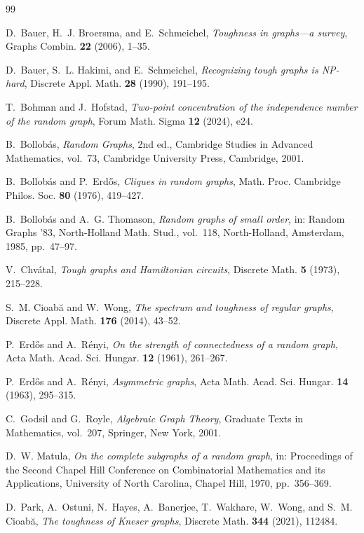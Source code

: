 \documentclass[11pt,reqno]{amsart}
\theoremstyle{definition}
\theoremstyle{remark}
\begin{document}
\begin{thebibliography}{99}

D.~Bauer, H.~J. Broersma, and E.~Schmeichel,
\emph{Toughness in graphs---a survey},
Graphs Combin. \textbf{22} (2006), 1--35.

D.~Bauer, S.~L. Hakimi, and E.~Schmeichel,
\emph{Recognizing tough graphs is NP-hard},
Discrete Appl. Math. \textbf{28} (1990), 191--195.

T.~Bohman and J.~Hofstad,
\emph{Two-point concentration of the independence number of the random graph},
Forum Math. Sigma \textbf{12} (2024), e24.

B.~Bollob\'as,
\emph{Random Graphs}, 2nd ed.,
Cambridge Studies in Advanced Mathematics, vol.~73,
Cambridge University Press, Cambridge, 2001.

B.~Bollob\'as and P.~Erd\H{o}s,
\emph{Cliques in random graphs},
Math. Proc. Cambridge Philos. Soc. \textbf{80} (1976), 419--427.

B.~Bollob\'as and A.~G. Thomason,
\emph{Random graphs of small order},
in: Random Graphs '83, North-Holland Math. Stud., vol.~118,
North-Holland, Amsterdam, 1985, pp.~47--97.

V.~Chv\'atal,
\emph{Tough graphs and Hamiltonian circuits},
Discrete Math. \textbf{5} (1973), 215--228.

S.~M. Cioab\u{a} and W.~Wong,
\emph{The spectrum and toughness of regular graphs},
Discrete Appl. Math. \textbf{176} (2014), 43--52.

P.~Erd\H{o}s and A.~R\'enyi,
\emph{On the strength of connectedness of a random graph},
Acta Math. Acad. Sci. Hungar. \textbf{12} (1961), 261--267.

P.~Erd\H{o}s and A.~R\'enyi,
\emph{Asymmetric graphs},
Acta Math. Acad. Sci. Hungar. \textbf{14} (1963), 295--315.

C.~Godsil and G.~Royle,
\emph{Algebraic Graph Theory},
Graduate Texts in Mathematics, vol.~207,
Springer, New York, 2001.



D.~W. Matula,
\emph{On the complete subgraphs of a random graph},
in: Proceedings of the Second Chapel Hill Conference on Combinatorial Mathematics and its Applications,
University of North Carolina, Chapel Hill, 1970, pp.~356--369.

D.~Park, A.~Ostuni, N.~Hayes, A.~Banerjee, T.~Wakhare,
W.~Wong, and S.~M. Cioab\u{a},
\emph{The toughness of Kneser graphs},
Discrete Math. \textbf{344} (2021), 112484.

\end{thebibliography}
\end{document}
